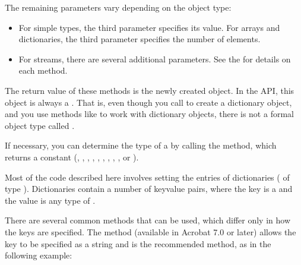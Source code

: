 \documentclass[letterpaper,12pt,english,openany,oneside]{sphinxmanual}
\begin{document}
The remaining parameters vary depending on the object type:
\begin{itemize}
\item {} 
For simple types, the third parameter specifies its value. For arrays and dictionaries, the third parameter specifies the number of elements.

\item {} 
For streams, there are several additional parameters. See the  for details on each method.

\end{itemize}

The return value of these methods is the newly created object. In the API, this object is always a . That is, even though you call  to create a dictionary object, and you use methods like  to work with dictionary objects, there is not a formal object type called .

If necessary, you can determine the type of a  by calling the  method, which returns a constant (, , , , , , , , , or  ).

Most of the code described here involves setting the entries of dictionaries ( of type  ). Dictionaries contain a number of key\sphinxhyphen{}value pairs, where the key is a  and the value is any type of .

There are several common methods that can be used, which differ only in how the keys are specified. The  method (available in Acrobat 7.0 or later) allows the key to be specified as a string and is the recommended method, as in the following example:

\begin{sphinxVerbatim}[commandchars=\\\{\}]
     
                            
                        
\end{sphinxVerbatim}
\end{document}
